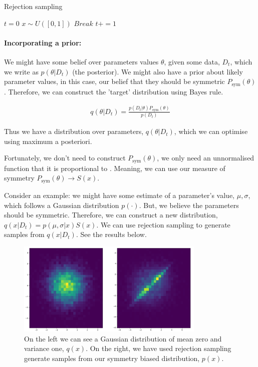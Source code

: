 \begin{algorithm}
	\caption{Rejection sampling}
	\begin{algorithmic}[1]

		\State $t=0$
			\State $x\sim U([0, 1])$
				\State $Break$
			\EndIf
			\State $t += 1$
		\EndWhile
		\State {}
		\EndProcedure

	\end{algorithmic}
\end{algorithm}

\paragraph{Incorporating a prior:} We might have some belief over parameters values $\theta$, given some data, $D_t$, which we write as $p(\theta| D_t)$ (the posterior).
We might also have a prior about likely parameter values, in this case, our belief that they should be symmetric $P_{\text{sym}}(\theta)$. Therefore, we can construct the 'target' distribution using Bayes rule.

\begin{align*}
q(\theta | D_t) = \frac{p(D_t | \theta)P_{\text{sym}}(\theta)}{p(D_t)}
\end{align*}

Thus we have a distribution over parameters, $q(\theta | D_t)$, which we can optimise using maximum a posteriori.

Fortunately, we don't need to construct $P_{\text{sym}}(\theta)$, we only need an unnormalised function that it is proportional to \cite{Owen2013}. Meaning, we can use our measure of symmetry $P_{\text{sym}}(\theta)\to S(x)$.

Consider an example: we might have some estimate of a parameter's value, $\mu, \sigma$, which follows a Gaussian distribution $p(\cdot)$. But, we believe the parameters should be symmetric. Therefore, we can construct a new distribution, $q(x | D_t) = p(\mu, \sigma| x)S(x)$. We can use rejection sampling to generate samples from $q(x | D_t)$. See the results below.


\begin{figure}[h!]
  \centering
  \includegraphics[width=0.8\textwidth,height=0.175\textheight]{../../pictures/figures/symmetric-gaussian.png}
  \caption{On the left we can see a Gaussian distribution of mean zero and variance one, $q(x)$.
  On the right, we have used rejection sampling generate samples from our symmetry biased distribution, $p(x)$.}
\end{figure}

